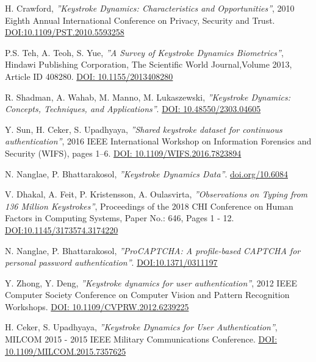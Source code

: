 \begin{thebibliography}{99}

H. Crawford, \textit{''Keystroke Dynamics: Characteristics and Opportunities''}, 2010 Eighth Annual International Conference on Privacy, Security and Trust.
\href{https://doi.org/10.1109/PST.2010.5593258}{DOI:10.1109/PST.2010.5593258}

P.S. Teh, A. Teoh, S. Yue, \textit{''A Survey of Keystroke Dynamics Biometrics''}, Hindawi Publishing Corporation, The Scientific World Journal,Volume 2013, Article ID 408280.
\href{http://dx.doi.org/10.1155/2013/408280}{DOI: 10.1155/2013408280}

R. Shadman, A. Wahab, M. Manno, M. Lukaszewski, \textit{''Keystroke Dynamics: Concepts, Techniques, and Applications''}.
\href{https://doi.org/10.48550/arXiv.2303.04605}{DOI: 10.48550/2303.04605}

Y. Sun, H. Ceker, S. Upadhyaya, \textit{''Shared keystroke dataset for continuous authentication''}, 2016 IEEE International Workshop on Information Forensics and Security (WIFS), pages 1–6.
\href{https://doi.org/10.1109/WIFS.2016.7823894}{DOI: 10.1109/WIFS.2016.7823894}

N. Nanglae, P. Bhattarakosol, \textit{''Keystroke Dynamics Data''}.
\href{https://doi.org/10.6084/m9.figshare.27135000.v1}{doi.org/10.6084}

V. Dhakal, A. Feit, P. Kristensson, A. Oulasvirta, \textit{''Observations on Typing from 136 Million Keystrokes''}, Proceedings of the 2018 CHI Conference on Human Factors in Computing Systems, Paper No.: 646, Pages 1 - 12.
\href{https://doi.org/10.1145/3173574.3174220}{DOI:10.1145/3173574.3174220}

N. Nanglae, P. Bhattarakosol, \textit{''ProCAPTCHA: A profile-based CAPTCHA for
personal password authentication''}.
\href{https://doi.org/10.1371/journal.pone.0311197}{DOI:10.1371/0311197}

Y. Zhong, Y. Deng, \textit{''Keystroke dynamics for user authentication''}, 2012 IEEE Computer Society Conference on Computer Vision and Pattern Recognition Workshops.
\href{https://doi.org/10.1109/CVPRW.2012.6239225}{DOI: 10.1109/CVPRW.2012.6239225}

H. Ceker, S. Upadhyaya, \textit{''Keystroke Dynamics for User Authentication''}, MILCOM 2015 - 2015 IEEE Military Communications Conference.
\href{https://doi.org/10.1109/MILCOM.2015.7357625}{DOI: 10.1109/MILCOM.2015.7357625}


\end{thebibliography}
